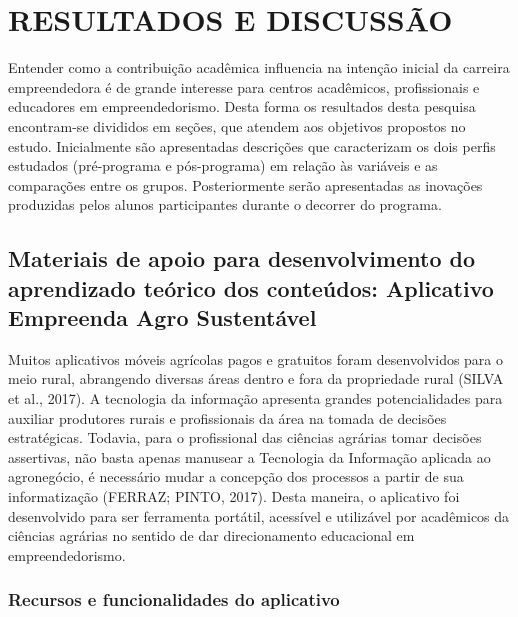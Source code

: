 \chapter{RESULTADOS E DISCUSSÃO}

Entender como a contribuição acadêmica influencia na intenção inicial da carreira empreendedora é de grande interesse para centros acadêmicos, profissionais e educadores em empreendedorismo. Desta forma os resultados desta pesquisa encontram-se divididos em seções, que atendem aos objetivos propostos no estudo.
Inicialmente são apresentadas descrições que caracterizam os dois perfis estudados
(pré-programa e pós-programa) em relação às variáveis e as comparações entre os grupos. Posteriormente serão apresentadas as inovações produzidas pelos alunos participantes durante o decorrer do programa.



\section{Materiais de apoio para desenvolvimento do aprendizado teórico dos conteúdos: Aplicativo Empreenda Agro Sustentável}

Muitos aplicativos móveis agrícolas pagos e gratuitos foram desenvolvidos para o meio rural, abrangendo diversas áreas dentro e fora da propriedade rural (SILVA et al., 2017). A tecnologia da informação apresenta grandes potencialidades para auxiliar produtores rurais e profissionais da área na tomada de decisões estratégicas. Todavia, para o profissional das ciências agrárias tomar decisões assertivas, não basta apenas manusear a Tecnologia da Informação aplicada ao agronegócio, é   necessário   mudar   a   concepção   dos   processos   a   partir   de   sua informatização (FERRAZ; PINTO, 2017).
Desta maneira, o aplicativo foi desenvolvido para ser ferramenta portátil, acessível e utilizável por acadêmicos da ciências agrárias no sentido de dar direcionamento educacional em empreendedorismo. 


\subsection{Recursos e funcionalidades do aplicativo}

